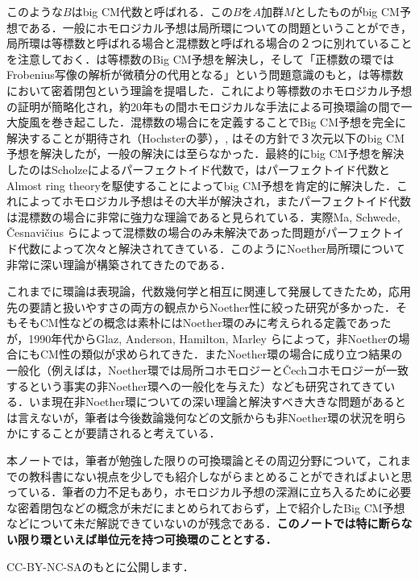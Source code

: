 \documentclass[autodetect-engine,dvi=dvipdfmx,ja=standard,japaram={units}]{bxjsarticle} %
\begin{document}
このような$B$はbig CM代数と呼ばれる．この$B$を$A$加群$M$としたものがbig CM予想である．一般にホモロジカル予想は局所環についての問題ということができ，局所環は等標数と呼ばれる場合と混標数と呼ばれる場合の２つに別れていることを注意しておく．\cite{Hochster1983}は等標数のBig CM予想を解決し，そして「正標数の環ではFrobenius写像の解析が微積分の代用となる」という問題意識のもと，\cite{Hochster1990}は等標数において密着閉包という理論を提唱した．これにより等標数のホモロジカル予想の証明が簡略化され，約20年もの間ホモロジカルな手法による可換環論の間で一大旋風を巻き起こした．混標数の場合にを定義することでBig CM予想を完全に解決することが期待され（Hochsterの夢），\cite{Heitmann2002}, \cite{Hochster2002}
	はその方針で３次元以下のbig CM予想を解決したが，一般の解決には至らなかった．最終的にbig CM予想を解決したのはScholzeによるパーフェクトイド代数で，\cite{Andre2018-1,Andre2018-2}はパーフェクトイド代数とAlmost ring theoryを駆使することによってbig CM予想を肯定的に解決した．これによってホモロジカル予想はその大半が解決され，またパーフェクトイド代数は混標数の場合に非常に強力な理論であると見られている．実際Ma, Schwede, \v{C}esnavi\v{c}ius らによって混標数の場合のみ未解決であった問題がパーフェクトイド代数によって次々と解決されてきている．このようにNoether局所環について非常に深い理論が構築されてきたのである．

これまでに環論は表現論，代数幾何学と相互に関連して発展してきたため，応用先の要請と扱いやすさの両方の観点からNoether性に絞った研究が多かった．そもそもCM性などの概念は素朴にはNoether環のみに考えられる定義であったが，1990年代からGlaz, Anderson, Hamilton, Marley らによって，非Noetherの場合にもCM性の類似が求められてきた．またNoether環の場合に成り立つ結果の一般化（例えば\cite{Schenzel2003}は，Noether環では局所コホモロジーと\v{C}echコホモロジーが一致するという事実の非Noether環への一般化を与えた）なども研究されてきている．いま現在非Noether環についての深い理論と解決すべき大きな問題があるとは言えないが，筆者は今後数論幾何などの文脈からも非Noether環の状況を明らかにすることが要請されると考えている．

本ノートでは，筆者が勉強した限りの可換環論とその周辺分野について，これまでの教科書にない視点を少しでも紹介しながらまとめることができればよいと思っている．筆者の力不足もあり，ホモロジカル予想の深淵に立ち入るために必要な密着閉包などの概念が未だにまとめられておらず，上で紹介したBig CM予想などについて未だ解説できていないのが残念である．\textbf{このノートでは特に断らない限り環といえば単位元を持つ可換環のこととする．}
	
	\hspace*{\fill}CC-BY-NC-SAのもとに公開します．
	{\large
		{\ccLogo}
		{\ccAttribution}
		{\ccNonCommercialJP}
		{\ccShareAlike}}
	
\end{document}
